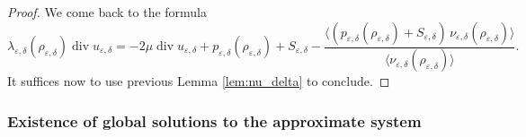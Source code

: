 \documentclass[10pt]{amsart}
\newcommand{\<}{\bigl\langle}
\renewcommand{\>}{\bigr\rangle}
\theoremstyle{definition}
\theoremstyle{remark}
\DeclareMathOperator{\Div}{div}
\let\ep\varepsilon
\begin{document}
\begin{proof} We come back to the formula
$$\lambda_{\varepsilon,\delta} (\rho_{\varepsilon,\delta}) \Div u_{\varepsilon,\delta} =
-2 \mu \Div u_{\varepsilon,\delta}
+ p_{\varepsilon,\delta} (\rho_{\varepsilon,\delta}) + S_{\ep,\delta}
- \frac{\<(p_{\varepsilon,\delta} (\rho_{\varepsilon,\delta}) + S_{\ep,\delta})\, \nu_{\varepsilon,\delta} (\rho_{\varepsilon,\delta})\>}{\<\nu_{\varepsilon,\delta} (\rho_{\varepsilon,\delta})\>}.
$$
It suffices now to use previous Lemma \ref{lem:nu_delta} to conclude.
\end{proof}

\subsubsection*{Existence of global solutions to the approximate system}
\end{document}
